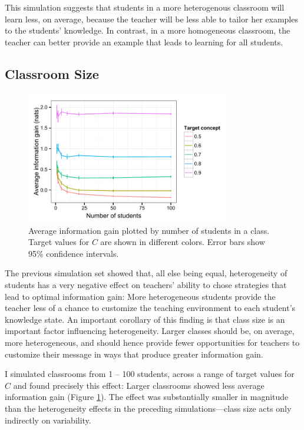 \documentclass[10pt,letterpaper]{article}
\begin{document}
This simulation suggests that students in a more heterogenous classroom will learn less, on average, because the teacher will be less able to tailor her examples to the students' knowledge. In contrast, in a more homogeneous classroom, the teacher can better provide an example that leads to learning for all students. 

\subsection{Classroom Size}

\begin{figure}
\begin{center}
\includegraphics[width=3.5in]{figures/class_size.pdf}
\end{center}
\caption{\label{fig:class} Average information gain plotted by number of students in a class. Target values for $C$ are shown in different colors. Error bars show 95\% confidence intervals.}
\end{figure}



The previous simulation set showed that, all else being equal, heterogeneity of students has a very negative effect on teachers' ability to chose strategies that lead to optimal information gain: More heterogeneous students provide the teacher less of a chance to customize the teaching environment to each student's knowledge state. An important corollary of this finding is that class size is an important factor influencing heterogeneity. Larger classes should be, on average, more heterogeneous, and should hence provide fewer opportunities for teachers to customize their message in ways that produce greater information gain.

I simulated classrooms from 1 -- 100 students, across a range of target values for $C$ and found precisely this effect: Larger classrooms showed less average information gain (Figure \ref{fig:class}). The  effect was substantially smaller in magnitude than the heterogeneity effects in the preceding simulations---class size acts only indirectly on variability. 
\end{document}
